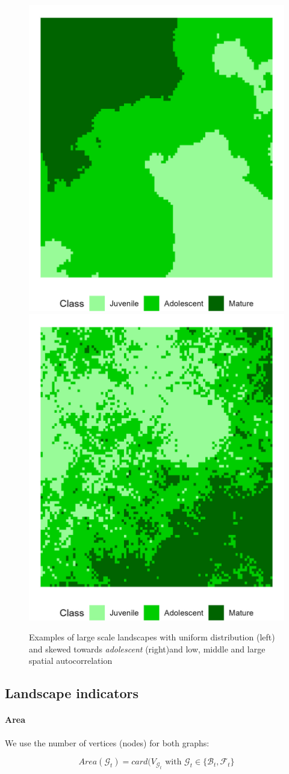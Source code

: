 \begin{figure}[H]
    \includegraphics[width=0.4\linewidth]{figures/wildland/large_land_autocorr_1.8_distrib_1}
    \includegraphics[width=0.4\linewidth]{figures/wildland/large_land_autocorr_0.5_distrib_4}
    \caption{Examples of large scale landscapes with uniform distribution (left) and skewed towards \textit{adolescent} (right)and low, middle and large spatial autocorrelation}
    \label{fig:ex_nlm}
\end{figure}
\clearpage





\subsection{Landscape indicators}
\label{sec:appendix_wildland__indicators}

\paragraph{Area}
We use the number of vertices (nodes) for both graphs:

\begin{equation}
Area(\mathcal{G}_t) = card(V_{\mathcal{G}_t} \text{ with } \mathcal{G}_t\in\{\mathcal{B}_t,\mathcal{F}_t\}
\label{eq:area}
\end{equation}


